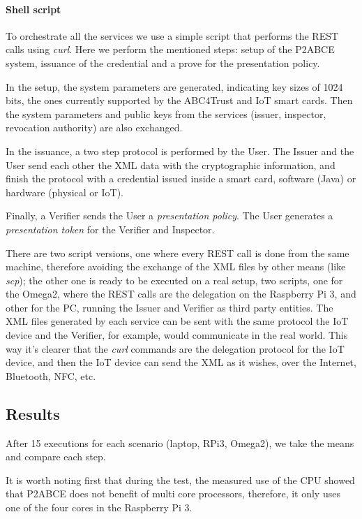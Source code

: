 \paragraph{Shell script} To orchestrate all the services we use a simple script that performs the REST calls using  \textit{curl}. Here we perform the mentioned steps: setup of the P2ABCE system, issuance of the credential and a prove for the presentation policy.

In the setup, the system parameters are generated, indicating key sizes of 1024 bits, the ones currently supported by the ABC4Trust and IoT smart cards. Then the system parameters and public keys from the services (issuer, inspector, revocation authority) are also exchanged.

In the issuance, a two step protocol is performed by the User. The Issuer and the User send each other the XML data with the cryptographic information, and finish the protocol with a credential issued inside a smart card, software (Java) or hardware (physical or IoT).

Finally, a Verifier sends the User a \textit{presentation policy}. The User generates a \textit{presentation token} for the Verifier and Inspector.


There are two script versions, one where every REST call is done from the same machine, therefore avoiding the exchange of the XML files by other means (like \textit{scp}); the other one is ready to be executed on a real setup, two scripts, one for the Omega2, where the REST calls are the delegation on the Raspberry Pi 3, and other for the PC, running the Issuer and Verifier as third party entities. The XML files generated by each service can be sent with the same protocol the IoT device and the Verifier, for example, would communicate in the real world. This way it's clearer that the \textit{curl} commands are the delegation protocol for the IoT device, and then the IoT device can send the XML as it wishes, over the Internet, Bluetooth, NFC, etc.


\subsection{Results}

After 15 executions for each scenario (laptop, RPi3, Omega2), we take the means and compare each step.

It is worth noting first that during the test, the measured use of the CPU showed that P2ABCE does not benefit of multi core processors, therefore, it only uses one of the four cores in the Raspberry Pi 3.

